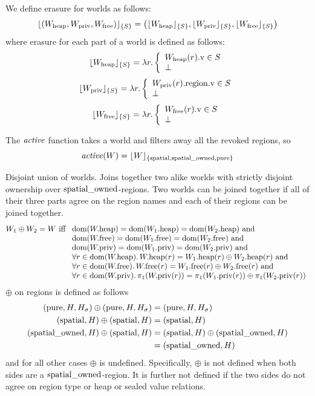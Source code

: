 \documentclass[a4paper]{article}
\begin{document}
We define erasure for worlds as follows:
\[
\erase{(W_{\mathrm{heap}},W_{\mathrm{priv}},W_{\mathrm{free}})}{S} =
  \left( \erase{W_{\mathrm{heap}}}{S},\erase{W_{\mathrm{priv}}}{S},\erase{W_{\mathrm{free}}}{S} \right)
\]
where erasure for each part of a world is defined as follows:
\[
\erase{W_{\mathrm{heap}}}{S} = \lambda r \ldotp \left\{
    \begin{array}{l}
      \prv{W_{\mathrm{heap}}(r)} \in S\\
      \bot
    \end{array}
  \right.
\]
\[
\erase{W_{\mathrm{priv}}}{S} = \lambda r \ldotp \left\{
    \begin{array}{l}
      \prv{\pregion{W_{\mathrm{priv}}(r)}} \in S \\
      \bot
    \end{array}
  \right.
\]
\[
\erase{W_{\mathrm{free}}}{S} = \lambda r \ldotp \left\{
    \begin{array}{l}
      \prv{W_{\mathrm{free}}(r)} \in S\\
      \bot
    \end{array}
  \right.
\]

The $\activeReg{}$ function takes a world and filters away all the revoked regions, so
\[
  \activeReg{W} = \erase{W}{\spatial,\spatialo,\pure}
\]

Disjoint union of worlds. Joins together two alike worlds with strictly disjoint ownership over $\spatialo$-regions. Two worlds can be joined together if all of their three parts agree on the region names and each of their regions can be joined together.
\[
  W_1 \oplus W_2 = W
  \text{ iff }
  \begin{array}[t]{l}
    \dom(\pwheap) = \dom(\pwheap[W_1]) = \dom(\pwheap[W_2]) \tand \\
    \dom(\pwfree) = \dom(\pwfree[W_1]) = \dom(\pwfree[W_2]) \tand \\
    \dom(\pwpriv) = \dom(\pwpriv[W_1]) = \dom(\pwpriv[W_2]) \tand \\
    \forall r \in \dom(\pwheap) \ldotp \pwheap(r) = \pwheap[W_1](r) \oplus \pwheap[W_2](r) \tand \\
    \forall r \in \dom(\pwfree) \ldotp \pwfree(r) = \pwfree[W_1](r) \oplus \pwfree[W_2](r) \tand \\
    \forall r \in \dom(\pwpriv) \ldotp \pi_1(\pwpriv(r)) = \pi_1(\pwpriv[W_1](r)) \oplus \pi_1(\pwpriv[W_2](r))
  \end{array}
\]
$\oplus$ on regions is defined as follows
\begin{align*}
  (\pure,H,H_\sigma) \oplus (\pure,H,H_\sigma) =  & \; (\pure,H,H_\sigma) \\
  (\spatial,H) \oplus (\spatial,H) =  & \; (\spatial,H) \\
  (\spatialo,H) \oplus (\spatial,H) = & \; (\spatial,H) \oplus (\spatialo,H)\\
                                           =  & \; (\spatialo,H)
\end{align*}
and for all other cases $\oplus$ is undefined. Specifically, $\oplus$ is not defined when both sides are a $\spatialo$-region. It is further not defined if the two sides do not agree on region type or heap or sealed value relations.
\end{document}
